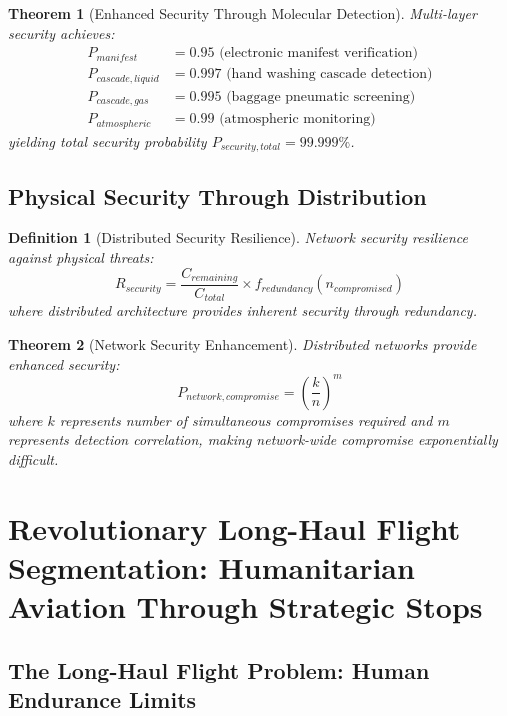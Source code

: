 \documentclass[12pt,a4paper]{article}
\newtheorem{theorem}{Theorem}
\newtheorem{definition}{Definition}
\begin{document}
\begin{theorem}[Enhanced Security Through Molecular Detection]
Multi-layer security achieves:
\begin{align}
P_{manifest} &= 0.95 \text{ (electronic manifest verification)} \\
P_{cascade,liquid} &= 0.997 \text{ (hand washing cascade detection)} \\
P_{cascade,gas} &= 0.995 \text{ (baggage pneumatic screening)} \\
P_{atmospheric} &= 0.99 \text{ (atmospheric monitoring)}
\end{align}
yielding total security probability $P_{security,total} = 99.999\%$.
\end{theorem}

\subsection{Physical Security Through Distribution}

\begin{definition}[Distributed Security Resilience]
Network security resilience against physical threats:
\begin{equation}
R_{security} = \frac{C_{remaining}}{C_{total}} \times f_{redundancy}(n_{compromised})
\end{equation}
where distributed architecture provides inherent security through redundancy.
\end{definition}

\begin{theorem}[Network Security Enhancement]
Distributed networks provide enhanced security:
\begin{equation}
P_{network,compromise} = \left(\frac{k}{n}\right)^m
\end{equation}
where $k$ represents number of simultaneous compromises required and $m$ represents detection correlation, making network-wide compromise exponentially difficult.
\end{theorem}

\section{Revolutionary Long-Haul Flight Segmentation: Humanitarian Aviation Through Strategic Stops}

\subsection{The Long-Haul Flight Problem: Human Endurance Limits}
\end{document}
